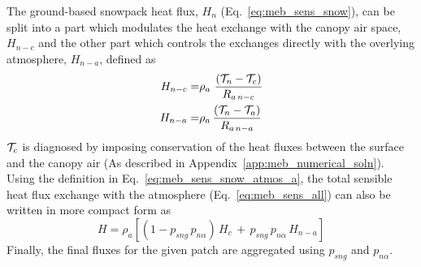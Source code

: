 %
%
%
%
%
The ground-based snowpack heat flux, $H_n$ (Eq.~\ref{eq:meb_sens_snow}), 
can be split into a part which modulates the
heat exchange
with the canopy air space, $H_{n-c}$ and the other part which 
controls the exchanges directly with the overlying atmosphere,
$H_{n-a}$, defined as
%
\begin{align}
%
\label{eq:meb_sens_snow_canopy_n}
H_{n-c} =& \rho_a \,
\, 
{\frac{\left( {\cal T}_n - {\cal T}_c \right)}{R_{a\,n-c}}} 
%
\\
\label{eq:meb_sens_snow_atmos_a}
H_{n-a} =& \rho_a \,
{\frac{\left( {\cal T}_n - {\cal T}_a \right)}{R_{a\,n-a}}}  
\end{align}
%
${\cal T}_c$ is diagnosed by imposing conservation of the heat fluxes
between the surface and the canopy air (As described in
Appendix~\ref{app:meb_numerical_soln}).
%
Using the definition in Eq.~\ref{eq:meb_sens_snow_atmos_a},
the total sensible heat flux exchange with the atmosphere 
(Eq.~\ref{eq:meb_sens_all})
can also be written in more compact form as
%
\begin{equation}
H = \rho_a \left[
\left(1-p_{sng}\,p_{n\alpha}\right) \, H_c
\,+\,
p_{sng}\,p_{n\alpha} \, H_{n-a}
\right]
\end{equation}
%
%
%
%
%
%
%
Finally, the final fluxes for the given patch are aggregated using
$p_{sng}$ and $p_{n\alpha}$.


